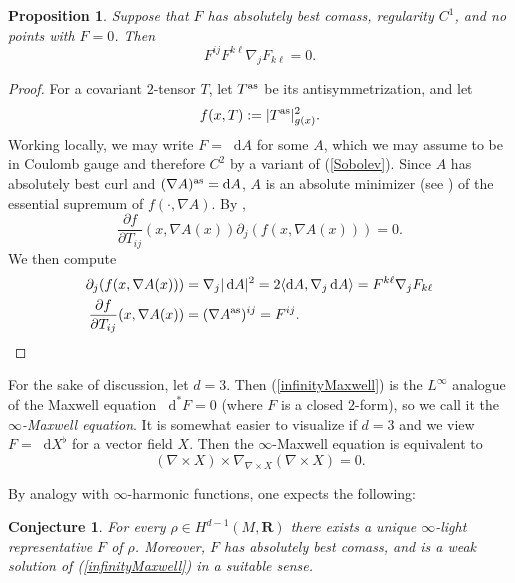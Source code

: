 \documentclass[reqno,11pt]{amsart}
\newcommand{\RR}{\mathbf{R}}
\newcommand*\dif{\mathop{}\!\mathrm{d}}
\newcommand{\dfn}[1]{\emph{#1}\index{#1}}
\newtheorem{proposition}[theorem]{Proposition}
\newtheorem{conjecture}[theorem]{Conjecture}
\theoremstyle{definition}
\numberwithin{equation}{section}
\begin{document}
\begin{proposition}
Suppose that $F$ has absolutely best comass, regularity $C^1$, and no points with $F = 0$. Then
\begin{equation}\label{infinityMaxwell}
	F^{ij} F^{k\ell} \nabla_j F_{k \ell} = 0.
\end{equation}
\end{proposition}
\begin{proof}
For a covariant $2$-tensor $T$, let $T^{\rm as}$ be its antisymmetrization, and let
$$f(x, T) := |T^{\rm as}|_{g(x)}^2.$$
Working locally, we may write $F = \dif A$ for some $A$, which we may assume to be in Coulomb gauge and therefore $C^2$ by a variant of (\ref{Sobolev}).
Since $A$ has absolutely best curl and $(\nabla A)^{\rm as} = \dif A$, $A$ is an absolute minimizer (see \cite[Definition 5.1]{Barron2001}) of the essential supremum of $f(\cdot, \nabla A)$.
By \cite[Theorem 5.2]{Barron2001},
\begin{equation}\label{ELA}
	\frac{\partial f}{\partial T_{ij}}(x, \nabla A(x)) \partial_j (f(x, \nabla A(x))) = 0.
\end{equation}
We then compute
\begin{align*}
\partial_j (f(x, \nabla A(x))) &= \nabla_j |\dif A|^2 = 2 \langle \dif A, \nabla_j \dif A\rangle = F^{k\ell} \nabla_j F_{k\ell} \\
\frac{\partial f}{\partial T_{ij}}(x, \nabla A(x)) &= (\nabla A^{\rm as})^{ij} = F^{ij}. \qedhere
\end{align*}
\end{proof}

For the sake of discussion, let $d = 3$.
Then (\ref{infinityMaxwell}) is the $L^\infty$ analogue of the Maxwell equation $\dif^* F = 0$ (where $F$ is a closed $2$-form), so we call it the \dfn{$\infty$-Maxwell equation}.
It is somewhat easier to visualize if $d = 3$ and we view $F = \dif X^\flat$ for a vector field $X$.
Then the $\infty$-Maxwell equation is equivalent to
$$(\nabla \times X) \times \nabla_{\nabla \times X} (\nabla \times X) = 0.$$

By analogy with $\infty$-harmonic functions, one expects the following:

\begin{conjecture}
For every $\rho \in H^{d - 1}(M, \RR)$ there exists a unique $\infty$-light representative $F$ of $\rho$.
Moreover, $F$ has absolutely best comass, and is a weak solution of (\ref{infinityMaxwell}) in a suitable sense.
\end{conjecture}
\end{document}
